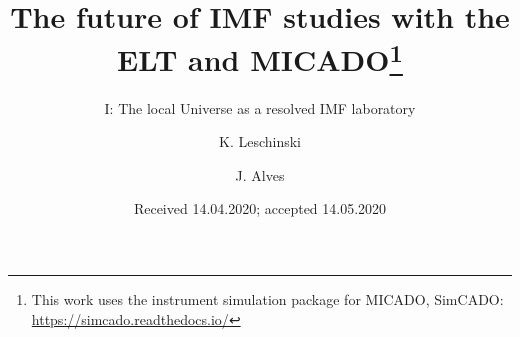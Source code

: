 \documentclass{aa}
\begin{document}
  \title{The future of IMF studies with the ELT and MICADO\thanks{This work uses the instrument simulation package for MICADO, SimCADO: \url{https://simcado.readthedocs.io/}}}
  \subtitle{I: The local Universe as a resolved IMF laboratory}
  \author{K. Leschinski
     \and
          J. Alves
     }


  \date{Received 14.04.2020; accepted 14.05.2020}

\end{document}
